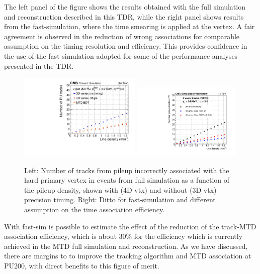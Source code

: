 The left panel of the figure shows the results obtained with the full
simulation and reconstruction described in this TDR, while the right
panel shows results from the fast-simulation, where the time smearing
is applied at the vertex. A fair agreement is observed in the
reduction of wrong associations for comparable assumption on the
timing resolution and efficiency. This provides confidence in the use of the fast
simulation adopted for some of the performance analyses presented in
the TDR.  

\begin{figure}[hbtp]
\centering
\includegraphics[width=0.52\textwidth]{fig/performance/purej/BDT_noTrackInfo/track_pu_vs_linden_nugun.pdf}
\includegraphics[width=0.46\textwidth]{fig/performance/purej/fastSim/nPUTracks_fromGenLevel_tres_eta3p0_pt0p9_1.pdf}
 \caption{Left: Number of tracks from pileup incorrectly 
   associated with the hard primary vertex in \ttbar events from full
   simulation as a function of the pileup density, shown with (4D vtx)
   and without (3D vtx) precision timing. Right: Ditto for
   fast-simulation and different assumption on the time association efficiency.}
   \label{fig:trkvtx}
\end{figure}

With fast-sim is possible to estimate the effect of the reduction of the track-MTD association efficiency, which is about 30\% for the efficiency which is currently achieved in the MTD full simulation and reconstruction. As we have discussed, there are margins to to improve the tracking algorithm and MTD association at PU200, with direct benefits to this figure of merit. 

